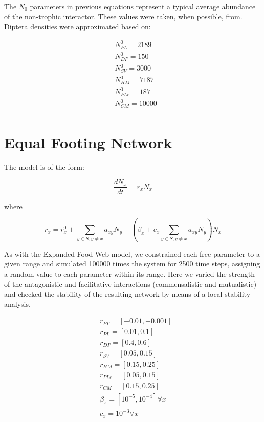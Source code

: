 The $N_0$ parameters in previous equations represent a typical average abundance of the non-trophic interactor. These values were taken, when possible, from. Diptera densities were approximated based on:

\begin{align*}
& N_{PL}^0 = 2189 \\
& N_{DP}^0 = 150 \\
& N_{SV}^0 = 3000 \\
& N_{HM}^0 = 7187 \\
& N_{PLe}^0 = 187 \\
& N_{CM}^0 = 10000 \\
\end{align*}

\section*{Equal Footing Network}

The model is of the form:

\begin{equation}
\frac{\mathit{dN}_x}{\mathit{dt}}=r_xN_x
\end{equation}

where

\begin{equation}
r_x=r_x^0+\sum _{y{\in}S,y{\neq}x}a_{\mathit{xy}}N_y-\left(\beta _x+c_x\sum _{y{\in}S,y{\neq}x}a_{\mathit{xy}}N_y\right)N_x
\end{equation}

As with the Expanded Food Web model, we constrained each free parameter to a given range and simulated 100000 times the system for 2500 time steps, assigning a random value to each parameter within its range. Here we varied the strength of the antagonistic and facilitative interactions (commensalistic and mutualistic) and checked the stability of the resulting network by means of a local stability analysis.

\begin{align*}
& r_{FT} = [-0.01,-0.001] \\
& r_{PL} = [0.01,0.1] \\
& r_{DP} = [0.4,0.6] \\
& r_{SV} = [0.05,0.15] \\
& r_{HM} = [0.15,0.25] \\
& r_{PLe} = [0.05,0.15] \\
& r_{CM} = [0.15,0.25] \\
& \beta_{x} = [10^{-5},10^{-4}] \forall x \\
& c_x = 10^{-3} \forall x
\end{align*}

